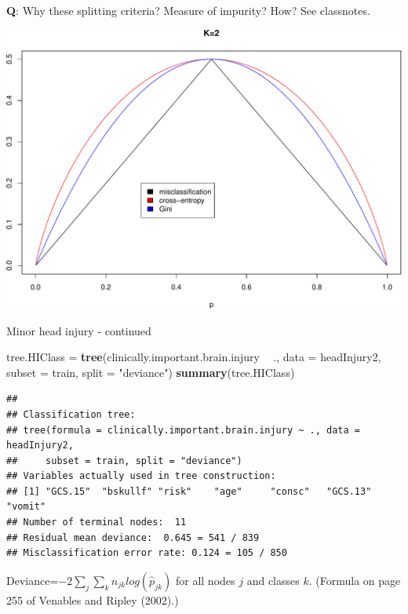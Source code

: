 \documentclass[ignorenonframetext,]{beamer}
\newenvironment{Shaded}{\begin{snugshade}}{\end{snugshade}}
\newcommand{\KeywordTok}[1]{\textcolor[rgb]{0.13,0.29,0.53}{\textbf{#1}}}
\newcommand{\DataTypeTok}[1]{\textcolor[rgb]{0.13,0.29,0.53}{#1}}
\newcommand{\StringTok}[1]{\textcolor[rgb]{0.31,0.60,0.02}{#1}}
\newcommand{\OperatorTok}[1]{\textcolor[rgb]{0.81,0.36,0.00}{\textbf{#1}}}
\newcommand{\NormalTok}[1]{#1}
\begin{document}
\begin{frame}

\textbf{Q}: Why these splitting criteria? Measure of impurity? How? See
classnotes.

\includegraphics{8TreesBEAMER_files/figure-beamer/unnamed-chunk-11-1.pdf}

\end{frame}

\begin{frame}[fragile]

\begin{block}{Minor head injury - continued}

\footnotesize

\begin{Shaded}
\begin{Highlighting}[]
\NormalTok{tree.HIClass =}\StringTok{ }\KeywordTok{tree}\NormalTok{(clinically.important.brain.injury }\OperatorTok{~}\StringTok{ }\NormalTok{., }\DataTypeTok{data =}\NormalTok{ headInjury2, }
    \DataTypeTok{subset =}\NormalTok{ train, }\DataTypeTok{split =} \StringTok{"deviance"}\NormalTok{)}
\KeywordTok{summary}\NormalTok{(tree.HIClass)}
\end{Highlighting}
\end{Shaded}

\begin{verbatim}
## 
## Classification tree:
## tree(formula = clinically.important.brain.injury ~ ., data = headInjury2, 
##     subset = train, split = "deviance")
## Variables actually used in tree construction:
## [1] "GCS.15"  "bskullf" "risk"    "age"     "consc"   "GCS.13"  "vomit"  
## Number of terminal nodes:  11 
## Residual mean deviance:  0.645 = 541 / 839 
## Misclassification error rate: 0.124 = 105 / 850
\end{verbatim}

\normalsize

Deviance=\(-2 \sum_{j}\sum_{k}n_{jk}log(\hat{p}_{jk})\) for all nodes
\(j\) and classes \(k\). (Formula on page 255 of Venables and Ripley
(2002).)

\end{block}

\end{frame}
\end{document}
